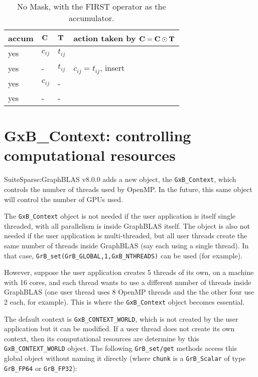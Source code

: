 \documentclass[12pt]{article}
\begin{document}
\begin{table}[h]
\begin{center}
{\small
\begin{tabular}{lll|l}
\hline
       accum & ${\bf C}$ & ${\bf T}$        & action taken by ${\bf C = C \odot T}$ \\
\hline
        yes & $c_{ij}$ & $t_{ij}$         &  \\
        yes &  -       & $t_{ij}$         &  $c_{ij} = t_{ij}$, insert \\
        yes & $c_{ij}$ &  -               &   \\
        yes &  -       &  -               &   \\
\hline
\end{tabular}
}
\caption{No Mask, with the FIRST operator as the accumulator.
\label{tab:maskaccum_nomask_1st}}
\end{center}
\end{table}

\newpage
\section{{\sf GxB\_Context:} controlling computational resources} %
\label{context}

SuiteSparse:GraphBLAS v8.0.0 adds a new object, the \verb'GxB_Context', which
controls the number of threads used by OpenMP.  In the future, this same object
will control the number of GPUs used.

The \verb'GxB_Context' object is not needed if the user application is itself
single threaded, with all parallelism is inside GraphBLAS itself.  The object
is also not needed if the user application is multi-threaded, but all user
threads create the same number of threads inside GraphBLAS (say each using a
single thread).  In that case, \verb'GrB_set(GrB_GLOBAL,1,GxB_NTHREADS)'
can be used (for example).

However, suppose the user application creates 5 threads of its own, on a
machine with 16 cores, and each thread wants to use a different number of
threads inside GraphBLAS (one user thread uses 8 OpenMP threads and the
the other four use 2 each, for example).  This is where the \verb'GxB_Context'
object becomes essential.

The default context is \verb'GxB_CONTEXT_WORLD', which is not created by the
user application but it can be modified.  If a user thread does not create its
own context, then its computational resources are determine by this
\verb'GxB_CONTEXT_WORLD' object.  The following \verb'GrB_set/get' methods
access this global object without naming it directly (where \verb'chunk'
is a \verb'GrB_Scalar' of type \verb'GrB_FP64' or \verb'GrB_FP32'):
\end{document}
